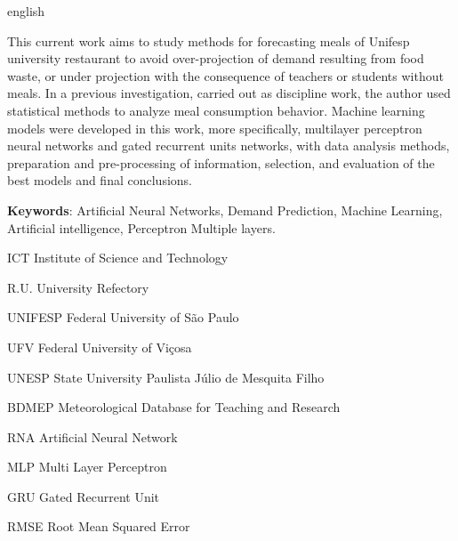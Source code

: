     \begin{resumo}[Abstract]
     \begin{otherlanguage*}{english}


        This current work aims to study methods for forecasting meals of Unifesp university restaurant to avoid over-projection of demand resulting from food waste, or under projection with the consequence of teachers or students without meals. In a previous investigation, carried out as discipline work, the author used statistical methods to analyze meal consumption behavior. Machine learning models were developed in this work, more specifically, multilayer perceptron neural networks and gated recurrent units networks, with data analysis methods, preparation and pre-processing of information, selection, and evaluation of the best models and final conclusions.

       \vspace{\onelineskip}
     
       \noindent 
       \textbf{Keywords}: Artificial Neural Networks, Demand Prediction, Machine Learning, Artificial intelligence, Perceptron Multiple layers.
     \end{otherlanguage*}
    \end{resumo}


  
    \listoffigures*
    \cleardoublepage

    \listoftables*
    \cleardoublepage


    \begin{siglas}
    \item[ICT] Institute of Science and Technology 
    \item[R.U.] University Refectory
    \item[UNIFESP]Federal University of São Paulo
    \item[UFV] Federal University of Viçosa
    \item[UNESP] State University Paulista Júlio de Mesquita Filho
    \item[BDMEP] Meteorological Database for Teaching and Research
    \item[RNA] Artificial Neural Network
    \item[MLP] Multi Layer Perceptron
    \item[GRU] Gated Recurrent Unit
    \item[RMSE] Root Mean Squared Error

    \end{siglas}
 
    \tableofcontents*
    \cleardoublepage
